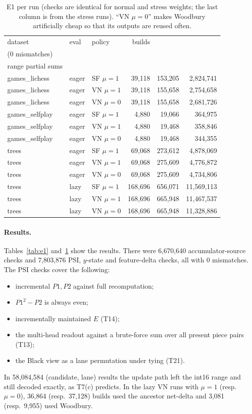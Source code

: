 \begin{table}[htbp]
\centering\small
\caption{E1 per run (checks are identical for normal and stress weights; the last column is from the stress runs). ``VN $\mu=0$'' makes Woodbury artificially cheap so that its outputs are reused often.}\label{tab:e1runs}
\begin{tabular}{@{}lllrrr@{}}
\toprule
dataset & eval & policy & builds & \hd{checks\\(0 mismatches)} & \hd{exact despite out-of-\\range partial sums}\\
\midrule
games\_lichess & eager & SF $\mu=1$ & 39,118 & 153,205 & 2,824,741\\
games\_lichess & eager & VN $\mu=1$ & 39,118 & 155,658 & 2,754,658\\
games\_lichess & eager & VN $\mu=0$ & 39,118 & 155,658 & 2,681,726\\
games\_selfplay & eager & SF $\mu=1$ & 4,880 & 19,066 & 364,975\\
games\_selfplay & eager & VN $\mu=1$ & 4,880 & 19,468 & 358,846\\
games\_selfplay & eager & VN $\mu=0$ & 4,880 & 19,468 & 344,355\\
trees & eager & SF $\mu=1$ & 69,068 & 273,612 & 4,878,069\\
trees & eager & VN $\mu=1$ & 69,068 & 275,609 & 4,776,872\\
trees & eager & VN $\mu=0$ & 69,068 & 275,609 & 4,734,806\\
trees & lazy & SF $\mu=1$ & 168,696 & 656,071 & 11,569,113\\
trees & lazy & VN $\mu=1$ & 168,696 & 665,948 & 11,467,537\\
trees & lazy & VN $\mu=0$ & 168,696 & 665,948 & 11,328,886\\
\bottomrule
\end{tabular}
\end{table}

\paragraph{Results.}
Tables~\ref{tab:e1} and~\ref{tab:e1runs} show the results.
There were 6,670,640 accumulator-source checks and 7,803,876 PSI, $y$-state and feature-delta checks, all with 0 mismatches.
The PSI checks cover the following:
\begin{itemize}[leftmargin=*,itemsep=1pt]
\item incremental $P1,P2$ against full recomputation;
\item $P1^2-P2$ is always even;
\item incrementally maintained $E$ (T14);
\item the multi-head readout against a brute-force sum over all present piece pairs (T13);
\item the Black view as a lane permutation under tying (T21).
\end{itemize}
In 58,084,584 (candidate, lane) results the update path left the int16 range and still decoded exactly, as T7(c) predicts.
In the lazy VN runs with $\mu=1$ (resp.\ $\mu=0$), 36,864 (resp.\ 37,128) builds used the ancestor net-delta and 3,081 (resp.\ 9,955) used Woodbury.

